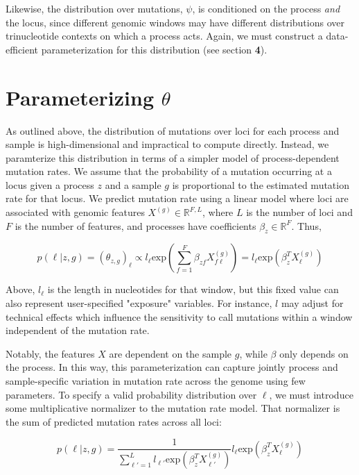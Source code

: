 \documentclass{article}
\begin{document}
Likewise, the distribution over mutations, $\psi$, is conditioned on the process \emph{and} the locus, since different genomic windows may have different 
distributions over trinucleotide contexts on which a process acts. Again, we must construct a data-efficient parameterization for this distribution (see section \textbf{4}).


\section{Parameterizing $\theta$}

As outlined above, the distribution of mutations over loci for each process and sample is high-dimensional and impractical to compute directly. Instead, we paramterize this
distribution in terms of a simpler model of process-dependent mutation rates. We assume that the probability of a mutation occurring at a locus given a process $z$ and a sample $g$ is proportional to the estimated mutation rate for that locus. We predict mutation rate using a linear model where loci are associated with genomic features $X^{(g)} \in \mathbb{R}^{F,L}$, where $L$ is the number of loci and $F$ is the number of features, and processes have coefficients $\beta_z \in \mathbb{R}^{F}$. Thus, 

\begin{equation} \label{3}
p(\ell | z, g) = (\theta_{z,g})_\ell \propto l_\ell  \textrm{exp}(\sum_{f=1}^{F}\beta_{zf} X^{(g)}_{f\ell}) = l_\ell \textrm{exp}(\beta_z^T X^{(g)}_\ell)
\end{equation}

Above, $l_\ell$ is the length in nucleotides for that window, but this fixed value can also represent user-specified "exposure" variables. For instance, $l$ may adjust for technical effects which influence the sensitivity to call mutations within a window independent of the mutation rate.

Notably, the features $X$ are dependent on the sample $g$, while $\beta$ only depends on the process. In this way, this parameterization can capture jointly process and sample-specific variation in mutation rate across the genome using few parameters. To specify a valid probability distribution over $\ell$, we must introduce some multiplicative normalizer to the mutation rate model. That normalizer is the sum of predicted mutation rates across all loci:

\begin{equation}
p(\ell | z, g) = \frac{1}{\sum_{\ell'=1}^L l_{\ell'} \textrm{exp}(\beta_z^T X^{(g)}_{\ell'})} l_\ell \textrm{exp}(\beta_z^T X^{(g)}_\ell)
\end{equation}
\end{document}
